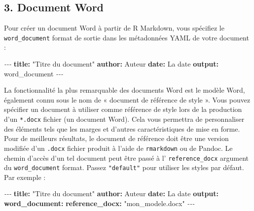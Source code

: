 \documentclass[
]{article}
\newenvironment{Shaded}{\begin{snugshade}}{\end{snugshade}}
\newcommand{\AttributeTok}[1]{\textcolor[rgb]{0.13,0.29,0.53}{#1}}
\newcommand{\FunctionTok}[1]{\textcolor[rgb]{0.13,0.29,0.53}{\textbf{#1}}}
\newcommand{\KeywordTok}[1]{\textcolor[rgb]{0.13,0.29,0.53}{\textbf{#1}}}
\newcommand{\PreprocessorTok}[1]{\textcolor[rgb]{0.56,0.35,0.01}{\textit{#1}}}
\newcommand{\StringTok}[1]{\textcolor[rgb]{0.31,0.60,0.02}{#1}}
\begin{document}
\hypertarget{document-word}{%
\subsection{3. Document Word}\label{document-word}}

Pour créer un document Word à partir de R Markdown, vous spécifiez le
\texttt{word\_document} format de sortie dans les métadonnées YAML de
votre document :

\begin{Shaded}
\begin{Highlighting}[]
\PreprocessorTok{{-}{-}{-}}
\FunctionTok{title}\KeywordTok{:}\AttributeTok{ }\StringTok{"Titre du document"}
\FunctionTok{author}\KeywordTok{:}\AttributeTok{ Auteur}
\FunctionTok{date}\KeywordTok{:}\AttributeTok{ La date}
\FunctionTok{output}\KeywordTok{:}\AttributeTok{ word\_document}
\PreprocessorTok{{-}{-}{-}}
\end{Highlighting}
\end{Shaded}

La fonctionnalité la plus remarquable des documents Word est le modèle
Word, également connu sous le nom de « document de référence de style ».
Vous pouvez spécifier un document à utiliser comme référence de style
lors de la production d'un \texttt{*.docx} fichier (un document Word).
Cela vous permettra de personnaliser des éléments tels que les marges et
d'autres caractéristiques de mise en forme. Pour de meilleurs résultats,
le document de référence doit être une version modifiée d'un
\texttt{.docx} fichier produit à l'aide de \texttt{rmarkdown} ou de
Pandoc. Le chemin d'accès d'un tel document peut être passé à l'
\texttt{reference\_docx} argument du \texttt{word\_document} format.
Passez \texttt{"default"} pour utiliser les styles par défaut. Par
exemple :

\begin{Shaded}
\begin{Highlighting}[]
\PreprocessorTok{{-}{-}{-}}
\FunctionTok{title}\KeywordTok{:}\AttributeTok{ }\StringTok{"Titre du document"}
\FunctionTok{author}\KeywordTok{:}\AttributeTok{ Auteur}
\FunctionTok{date}\KeywordTok{:}\AttributeTok{ La date}
\FunctionTok{output}\KeywordTok{:}\AttributeTok{ }
\AttributeTok{  }\FunctionTok{word\_document}\KeywordTok{:}
\AttributeTok{    }\FunctionTok{reference\_docx}\KeywordTok{:}\AttributeTok{ }\StringTok{"mon\_modele.docx"}
\PreprocessorTok{{-}{-}{-}}
\end{Highlighting}
\end{Shaded}
\end{document}
